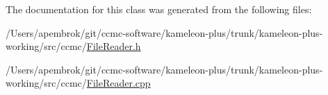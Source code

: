 The documentation for this class was generated from the following files\-:\begin{DoxyCompactItemize}
\item 
/\-Users/apembrok/git/ccmc-\/software/kameleon-\/plus/trunk/kameleon-\/plus-\/working/src/ccmc/\hyperlink{_file_reader_8h}{File\-Reader.\-h}\item 
/\-Users/apembrok/git/ccmc-\/software/kameleon-\/plus/trunk/kameleon-\/plus-\/working/src/ccmc/\hyperlink{_file_reader_8cpp}{File\-Reader.\-cpp}\end{DoxyCompactItemize}
